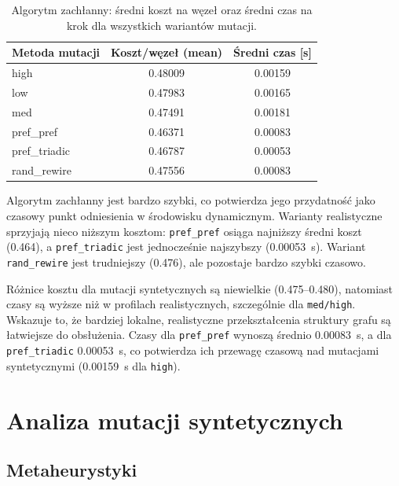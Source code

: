 \begin{table}[H]
  \centering
  \caption{Algorytm zachłanny: średni koszt na węzeł oraz średni czas na krok dla wszystkich wariantów mutacji.}
  \label{tab:greedy-cold-summary}
  \begin{tabular}{lcc}
    \toprule
    \textbf{Metoda mutacji} & \textbf{Koszt/węzeł (mean)} & \textbf{Średni czas [s]} \\
    \midrule
    high                    & 0.48009                     & 0.00159                  \\
    low                     & 0.47983                     & 0.00165                  \\
    med                     & 0.47491                     & 0.00181                  \\
    pref\_pref              & 0.46371                     & 0.00083                  \\
    pref\_triadic           & 0.46787                     & 0.00053                  \\
    rand\_rewire            & 0.47556                     & 0.00083                  \\
    \bottomrule
  \end{tabular}
\end{table}

Algorytm zachłanny jest bardzo szybki, co potwierdza jego przydatność jako czasowy punkt odniesienia w środowisku dynamicznym. Warianty realistyczne sprzyjają nieco niższym kosztom: \texttt{pref\_pref} osiąga najniższy średni koszt (0.464), a \texttt{pref\_triadic} jest jednocześnie najszybszy (\SI{0.00053}{\s}). Wariant \texttt{rand\_rewire} jest trudniejszy (0.476), ale pozostaje bardzo szybki czasowo.

Różnice kosztu dla mutacji syntetycznych są niewielkie (0.475--0.480), natomiast czasy są wyższe niż w profilach realistycznych, szczególnie dla \texttt{med/high}. Wskazuje to, że bardziej lokalne, realistyczne przekształcenia struktury grafu są łatwiejsze do obsłużenia. Czasy dla \texttt{pref\_pref} wynoszą średnio \SI{0.00083}{\s}, a dla \texttt{pref\_triadic} \SI{0.00053}{\s}, co potwierdza ich przewagę czasową nad mutacjami syntetycznymi (\SI{0.00159}{\s} dla \texttt{high}).

\section{Analiza mutacji syntetycznych}
\subsection{Metaheurystyki}

